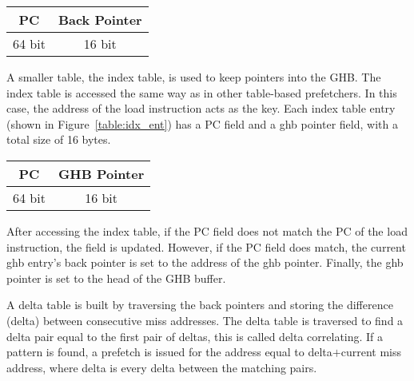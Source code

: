 \begin{center}
  \begin{tabular}{| c | c |}
    \hline
    PC & Back Pointer \\ \hline
    64 bit & 16 bit \\ \hline
  \end{tabular}
  \label{table:ghb_ent}
\end{center}

A smaller table, the index table, is used to keep pointers into the
GHB. The index table is accessed the same way as in other table-based
prefetchers. In this case, the address of the load instruction acts as
the key. Each index table entry (shown in Figure~\ref{table:idx_ent})
has a PC field and a ghb pointer field, with a total size of 16 bytes.

\begin{center}
  \begin{tabular}{| c | c |}
    \hline
    PC & GHB Pointer \\ \hline
    64 bit & 16 bit \\ \hline
  \end{tabular}
  \label{table:idx_ent}
\end{center}

After accessing the index table, if the PC field does not match the PC
of the load instruction, the field is updated. However, if the PC
field does match, the current ghb entry's back pointer is set to the
address of the ghb pointer. Finally, the ghb pointer is set to the
head of the GHB buffer.

A delta table is built by traversing the back pointers and storing the
difference (delta) between consecutive miss addresses. The delta table
is traversed to find a delta pair equal to the first pair of deltas,
this is called delta correlating. If a pattern is found, a prefetch is
issued for the address equal to delta$+$current miss address, where
delta is every delta between the matching pairs.
